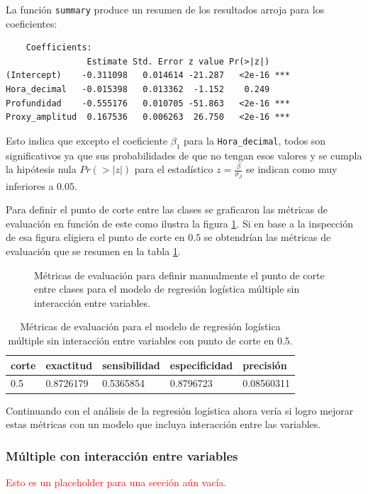 \documentclass[a4paper]{report}
\begin{document}
La función \lstinline[language = R]'summary' produce un resumen de los resultados arroja para los coeficientes:
\begin{verbatim}
	Coefficients:
                Estimate Std. Error z value Pr(>|z|)    
(Intercept)    -0.311098   0.014614 -21.287   <2e-16 ***
Hora_decimal   -0.015398   0.013362  -1.152    0.249    
Profundidad    -0.555176   0.010705 -51.863   <2e-16 ***
Proxy_amplitud  0.167536   0.006263  26.750   <2e-16 ***
\end{verbatim} 
Esto indica que excepto el coeficiente \(\beta_1\) para la \lstinline[language = R]'Hora_decimal', todos son significativos ya que sus probabilidades de que no tengan esos valores y se cumpla la hipótesis nula \(Pr(>|z|)\) para el estadístico \(z = \frac{\beta}{\sigma_\beta}\) se indican como muy inferiores a \(0.05\).

Para definir el punto de corte entre las clases se graficaron las métricas de evaluación en función de este como ilustra la figura \ref{fig:múltiple_metrics}.
Si en base a la inspección de esa figura eligiera el punto de corte en \(0.5\) se obtendrían las métricas de evaluación que se resumen en la tabla \ref{tab:múltiple_metrics}.

\begin{figure}[!ht]
	\centering
	
	\caption{Métricas de evaluación para definir manualmente el punto de corte entre clases para el modelo de regresión logística múltiple sin interacción entre variables.}
	\label{fig:múltiple_metrics}
\end{figure}

\begin{table}[!ht]
\centering
\begin{tabular}{lllll}
\toprule
corte & exactitud & sensibilidad & especificidad & precisión \\
\midrule
\num{0.5} & \num{0.8726179} & \num{0.5365854} & \num{0.8796723} & \num{0.08560311} \\
\bottomrule
\end{tabular}
\caption{Métricas de evaluación para el modelo de regresión logística múltiple sin interacción entre variables con punto de corte en \(0.5\).}
\label{tab:múltiple_metrics}
\end{table}


Continuando con el análisis de la regresión logística ahora vería si logro mejorar estas métricas con un modelo que incluya interacción entre las variables.

\subsubsection{Múltiple con interacción entre variables}
\textcolor{red}{Esto es un placeholder para una sección aún vacía.}
\end{document}
